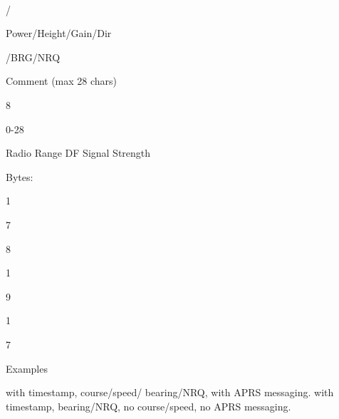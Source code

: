 \

/

Power/Height/Gain/Dir

/BRG/NRQ

Comment
(max 28
chars)

8

0-28

Radio Range
DF Signal Strength

Bytes:

1

7

8

1

9

1

7

Examples



with timestamp, course/speed/
bearing/NRQ, with APRS messaging.
with timestamp, bearing/NRQ, no
course/speed, no APRS messaging.



